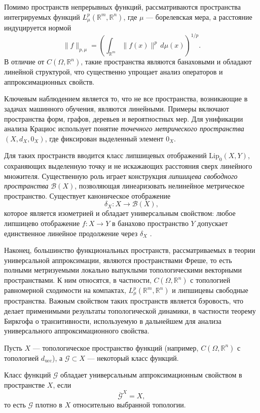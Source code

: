 \documentclass[../NDCNNAI_main.tex]{subfiles}
\begin{document}
Помимо пространств непрерывных функций, рассматриваются пространства
интегрируемых функций $L^p_\mu(\mathbb{R}^m,\mathbb{R}^n)$, где $\mu$ --- борелевская
мера, а расстояние индуцируется нормой
\[
\|f\|_{p,\mu} = \left(\int_{\mathbb{R}^m}\|f(x)\|^p\,d\mu(x)\right)^{1/p}.
\]
В отличие от $C(\Omega,\mathbb{R}^n)$, такие пространства являются банаховыми и
обладают линейной структурой, что существенно упрощает анализ операторов и
аппроксимационных свойств.

Ключевым наблюдением является то, что не все пространства, возникающие в задачах
машинного обучения, являются линейными. Примеры включают пространства форм,
графов, деревьев и вероятностных мер. Для унификации анализа Крациос использует
понятие \emph{точечного метрического пространства}
$(X,d_X,0_X)$, где фиксирован выделенный элемент $0_X$.

Для таких пространств вводится класс липшицевых отображений
$\mathrm{Lip}_0(X,Y)$, сохраняющих выделенную точку и не искажающих расстояния
сверх линейного множителя. Существенную роль играет конструкция
\emph{липшицева свободного пространства} $\mathcal{B}(X)$, позволяющая
линеаризовать нелинейное метрическое пространство. Существует каноническое
отображение
\[
\delta_X\colon X \to \mathcal{B}(X),
\]
которое является изометрией и обладает универсальным свойством:
любое липшицево отображение $f\colon X \to Y$ в банахово пространство $Y$ допускает
единственное линейное продолжение через $\delta_X$
\cite[Example~3, Section~2.1]{Kratsios2021}.

Наконец, большинство функциональных пространств, рассматриваемых в теории
универсальной аппроксимации, являются пространствами Фреше, то есть
полными метризуемыми локально выпуклыми топологическими векторными
пространствами. К ним относятся, в частности,
$C(\Omega,\mathbb{R}^n)$ с топологией равномерной сходимости на компактах,
$L^p_\mu(\mathbb{R}^m,\mathbb{R}^n)$ и липшицевы свободные пространства.
Важным свойством таких пространств является бэровость, что делает применимыми
результаты топологической динамики, в частности теорему Биркгофа о транзитивности,
используемую в дальнейшем для анализа универсального аппроксимационного свойства.

Пусть $X$ --- топологическое пространство функций (например,
$C(\Omega,\mathbb{R}^n)$ с топологией $d_{\mathrm{ucc}}$), а $\mathcal{G}\subset X$ ---
некоторый класс функций.

\begin{definition}
Класс функций $\mathcal{G}$ обладает универсальным аппроксимационным свойством
в пространстве $X$, если
\[
\overline{\mathcal{G}}^X = X,
\]
то есть $\mathcal{G}$ плотно в $X$ относительно выбранной топологии.
\end{definition}
\end{document}
